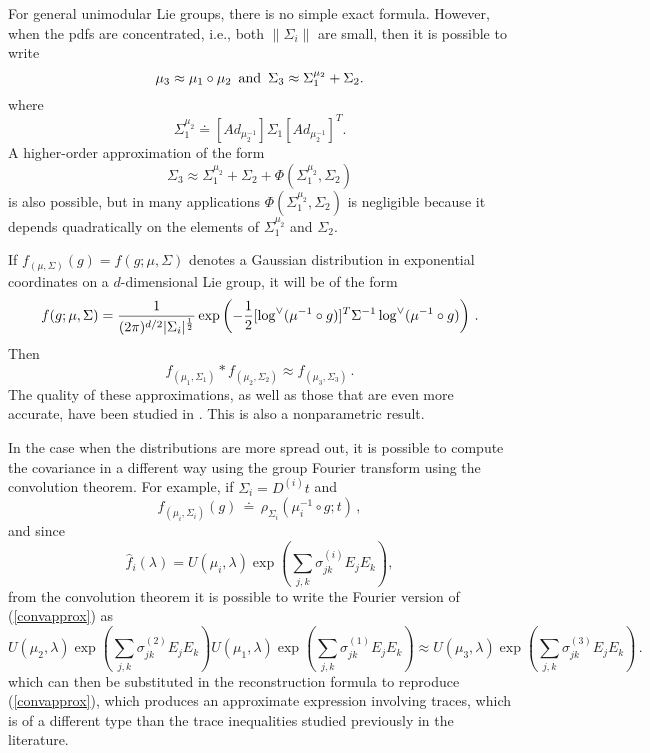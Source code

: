 \documentclass{svmult}
\def\half{ {1\over 2} }
\begin{document}
For general unimodular Lie groups, there is no simple exact formula. However,
when the pdfs are concentrated, i.e., both $\|\Sigma_i\|$ are small, then
it is possible to write \cite{wangprop1}
$$ \mu_3 \approx \mu_1 \circ \mu_2 \,\,\,{\rm and}\,\,\,
\Sigma_3 \approx  \Sigma_1^{\mu_2} + \Sigma_2. $$
where
$$ \Sigma_1^{\mu_2} \doteq [Ad_{\mu_2^{-1}}] \Sigma_1 [Ad_{\mu_2^{-1}}]^T. $$
A higher-order approximation of the form \cite{wangprop2}
\begin{equation}
\Sigma_3 \approx  \Sigma_1^{\mu_2} + \Sigma_2 +
\Phi(\Sigma_1^{\mu_2} , \Sigma_2 )
\label{sig3def}
\end{equation}
is also possible, but in many applications $\Phi(\Sigma_1^{\mu_2} , \Sigma_2)$
is negligible because it depends quadratically on the elements of
$\Sigma_1^{\mu_2}$ and $\Sigma_2$.

If $f_{(\mu, \Sigma)}(g) = f(g; \mu, \Sigma)$ denotes a Gaussian distribution in exponential coordinates on a $d$-dimensional Lie group,
it will be of the form
$$ f(g; \mu, \Sigma) = \frac{1}{(2\pi)^{d/2} |\Sigma_i|^{\half}}
\exp\left(-\half [\log^{\vee}(\mu^{-1} \circ g)]^T \Sigma^{-1} \log^{\vee}(\mu^{-1} \circ g)\right)\,. $$
Then
\begin{equation}
f_{(\mu_1, \Sigma_1)}*f_{(\mu_2, \Sigma_2)} \approx f_{(\mu_3, \Sigma_3)}\,.
\label{convapprox}
\end{equation}
The quality of these approximations, as well as those that are even
more accurate, have been studied in \cite{dover}. This is also a nonparametric result.

In the case when the distributions are more spread out, it is possible to compute the covariance
in a different way using the group Fourier transform using the convolution theorem.
For example, if $\Sigma_i = D^{(i)}t$ and
$$ f_{(\mu_i,\Sigma_i)}(g) \,\doteq\, \rho_{\Sigma_i}(\mu_{i}^{-1} \circ g;t) \,, $$
and since
$$ \hat{f}_i(\lambda) = U(\mu_i,\lambda) \exp\left(\sum_{j,k} \sigma_{jk}^{(i)} E_j E_k\right), $$
from the convolution theorem it is possible to write
the Fourier version of (\ref{convapprox}) as
$$ U(\mu_2,\lambda) \exp\left(\sum_{j,k} \sigma_{jk}^{(2)} E_j E_k\right)
U(\mu_1,\lambda) \exp\left(\sum_{j,k} \sigma_{jk}^{(1)} E_j E_k\right) \approx
U(\mu_3,\lambda) \exp\left(\sum_{j,k} \sigma_{jk}^{(3)} E_j E_k\right)\,.$$
which can then be substituted in the reconstruction formula to reproduce (\ref{convapprox}), which
produces an approximate expression involving traces, which is of a different type than the trace
inequalities studied previously in the literature.
\end{document}
